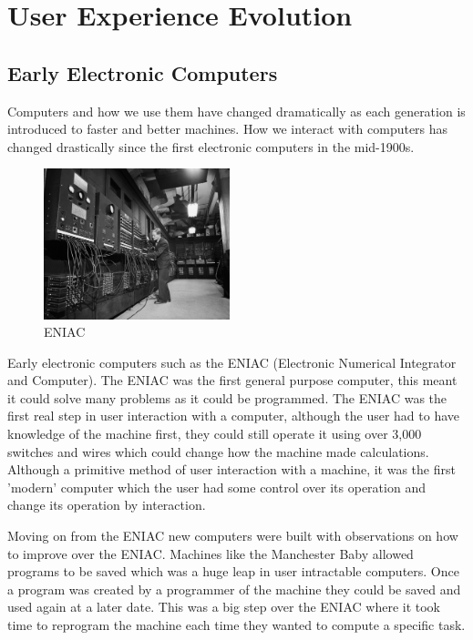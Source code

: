 \chapter{User Experience Evolution}

\section{Early Electronic Computers}
Computers and how we use them have changed dramatically as each generation is introduced to faster and better machines. How we interact with computers has changed drastically since the first electronic computers in the mid-1900s.

\begin{figure}
  \begin{center}
    \includegraphics[width=0.48\textwidth]{img/eniac.jpg}
  \end{center}
  \caption{ENIAC}
\end{figure}

Early electronic computers such as the ENIAC (Electronic Numerical Integrator and Computer). \cite{eniac} The ENIAC was the first general purpose computer, this meant it could solve many problems as it could be programmed. The ENIAC was the first real step in user interaction with a computer, although the user had to have knowledge of the machine first, they could still operate it using over 3,000 switches and wires which could change how the machine made calculations. \cite{eniac} Although a primitive method of user interaction with a machine, it was the first 'modern' computer which the user had some control over its operation and change its operation by interaction.

Moving on from the ENIAC new computers were built with observations on how to improve over the ENIAC. Machines like the Manchester Baby \cite{manchesterbaby} allowed programs to be saved which was a huge leap in user intractable computers. Once a program was created by a programmer of the machine they could be saved and used again at a later date. This was a big step over the ENIAC where it took time to reprogram the machine each time they wanted to compute a specific task.

